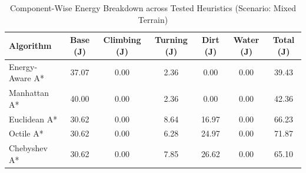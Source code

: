 \begin{table}[t]
\centering
\caption{Component-Wise Energy Breakdown across Tested Heuristics (Scenario: Mixed Terrain)}
\label{tab:energy_breakdown}
\begin{tabular}{lcccccc}
\toprule
\textbf{Algorithm} & \textbf{Base (J)} & \textbf{Climbing (J)} & \textbf{Turning (J)} & \textbf{Dirt (J)} & \textbf{Water (J)} & \textbf{Total (J)} \\
\midrule
Energy-Aware A* & 37.07 & 0.00 & 2.36 & 0.00 & 0.00 & 39.43 \\
Manhattan A* & 40.00 & 0.00 & 2.36 & 0.00 & 0.00 & 42.36 \\
Euclidean A* & 30.62 & 0.00 & 8.64 & 16.97 & 0.00 & 66.23 \\
Octile A* & 30.62 & 0.00 & 6.28 & 24.97 & 0.00 & 71.87 \\
Chebyshev A* & 30.62 & 0.00 & 7.85 & 26.62 & 0.00 & 65.10 \\
\bottomrule
\end{tabular}
\end{table}